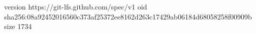 version https://git-lfs.github.com/spec/v1
oid sha256:08a92452016560c373af25372ee8162d263c17429ab06184d68058258f00909b
size 1734
